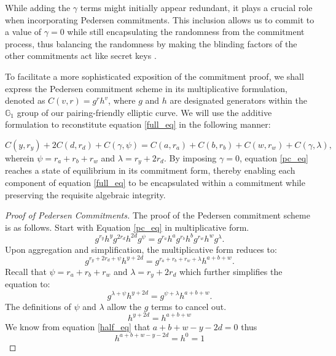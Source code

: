 \documentclass[version=preprint]{iacrcc}
\begin{document}
While adding the \( \gamma \) terms might initially appear redundant, it plays a crucial role when incorporating Pedersen commitments. This inclusion allows us to commit to a value of \( \gamma = 0 \) while still encapsulating the randomness from the commitment process, thus balancing the randomness by making the blinding factors of the other commitments act like secret keys \cite{mw16}.

To facilitate a more sophisticated exposition of the commitment proof, we shall express the Pedersen commitment scheme in its multiplicative formulation, denoted as \( C(v, r) = g^{r} h^{v} \), where \( g \) and \( h \) are designated generators within the \( \mathbb{G}_{1} \) group of our pairing-friendly elliptic curve. We will use the additive formulation to reconstitute equation \ref{full_eq} in the following manner:

\begin{equation}
\label{pc_eq}
C(y, r_{y}) + 2 C(d, r_{d}) + C(\gamma, \psi) = C(a, r_{a}) + C(b, r_{b}) + C(w, r_{w}) + C(\gamma, \lambda),
\end{equation}
wherein \( \psi = r_{a} + r_{b} + r_{w} \) and \( \lambda = r_{y} + 2r_{d} \). By imposing \( \gamma = 0 \), equation \ref{pc_eq} reaches a state of equilibrium in its commitment form, thereby enabling each component of equation \ref{full_eq} to be encapsulated within a commitment while preserving the requisite algebraic integrity.

\begin{proof}[Proof of Pedersen Commitments]
\label{commitment_proof}
The proof of the Pedersen commitment scheme is as follows. Start with Equation \ref{pc_eq} in multiplicative form.
\begin{equation}
g^{r_{y}} h^{y} g^{2 r_{d}} h^{2 d} g^{\psi} = g^{r_{a}} h^{a} g^{r_{b}} h^{b} g^{r_{w}} h^{w} g^{\lambda}.
\end{equation}
Upon aggregation and simplification, the multiplicative form reduces to:
\begin{equation}
\label{full_form}
g^{r_{y} + 2 r_{d} + \psi} h^{y + 2 d}  = g^{r_{a} + r_{b} + r_{w} + \lambda}  h^{a + b + w}.
\end{equation}
Recall that \( \psi = r_{a} + r_{b} + r_{w} \) and \( \lambda = r_{y} + 2r_{d} \) which further simplifies the equation to:
\begin{equation}
g^{\lambda + \psi} h^{y + 2 d}  = g^{\psi + \lambda}  h^{a + b + w}.
\end{equation}
The definitions of \( \psi \) and \( \lambda \) allow the \( g \) terms to cancel out.
\begin{equation}
h^{y + 2 d} = h^{a + b + w}
\end{equation}
We know from equation \ref{half_eq} that $a + b + w - y - 2d = 0$ thus
\begin{equation}
h^{a + b + w - y - 2 d} = h^{0} = 1
\end{equation}

\end{proof}
\end{document}
